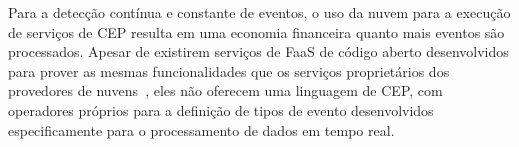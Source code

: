 Para a detecção contínua e constante de eventos, o uso da nuvem para a execução de serviços de CEP resulta em uma economia financeira quanto mais eventos são processados. Apesar de existirem serviços de FaaS de código aberto desenvolvidos para prover as mesmas funcionalidades que os serviços proprietários dos provedores de nuvens~\citep{Knative,Kubeless,OpenFaaS,Serverless}, eles não oferecem uma linguagem de CEP, com operadores próprios para a definição de tipos de evento desenvolvidos especificamente para o processamento de dados em tempo real.








